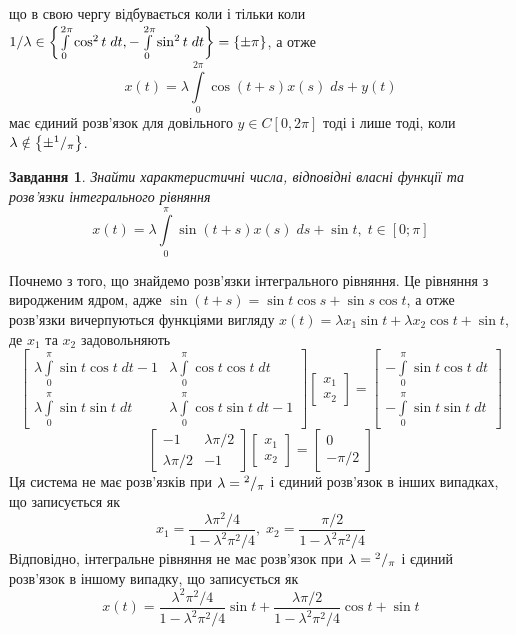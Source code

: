 \documentclass[10pt]{article}
\newtheorem{prob}{Завдання}
\newcommand{\ds}{\;ds}
\newcommand{\dt}{\;dt}
\let\oldint\int
\renewcommand{\int}{\oldint\limits}
\begin{document}
		що в свою чергу відбувається коли і тільки коли $1/\lambda\in\mycbra{
		\int_0^{2\pi}\cos^2t\dt,-\int_0^{2\pi}\sin^2t\dt}=\mycbra{\pm\pi}$, а отже
		\[x(t)=\lambda\int_0^{2\pi}\cos(t+s)x(s)\ds+y(t)\]
		має
		єдиний розв’язок для довільного $y\in C[0,2\pi]$ тоді і лише тоді, коли $\lambda\notin\left\{\pm{^{1}/_{\pi}}\right\}$.
\begin{prob}
	Знайти характеристичні числа, відповідні власні функції та розв’язки інтегрального рівняння
	\[x(t)=\lambda\int_{0}^{\pi}\sin(t+s) x(s)\ds+\sin t,\;t\in[0;\pi]\]
\end{prob}
	Почнемо з того, що знайдемо розв’язки інтегрального рівняння. Це рівняння з виродженим ядром, адже $\sin(t+s)=\sin t\cos s+
	\sin s\cos t$, а отже розв’язки вичерпуються функціями вигляду
	$x(t)=\lambda x_1\sin t+\lambda x_2\cos t+\sin t$, де $x_1$ та $x_2$ задовольняють
	\[\begin{bmatrix}
		\lambda\int_0^\pi \sin t\cos t\dt-1 & \lambda\int_0^\pi\cos t\cos t\dt\\
		\lambda\int_0^\pi \sin t\sin t\dt & \lambda\int_0^\pi\cos t\sin t\dt-1
	\end{bmatrix}
	\begin{bmatrix}x_1\\x_2\end{bmatrix}=\begin{bmatrix}-\int_0^\pi\sin t\cos t\dt\\
		-\int_0^\pi\sin t\sin t\dt\end{bmatrix}\]
	\[\begin{bmatrix}
		-1&\lambda\pi/2\\
		\lambda\pi/2&-1
	\end{bmatrix}
	\begin{bmatrix}x_1\\x_2\end{bmatrix}=\begin{bmatrix}0\\-\pi/2\end{bmatrix}\]
	Ця система не має розв’язків при $\lambda={^{2}/_{\pi}}$ і єдиний розв’язок в інших випадках, що записується як
	\[x_1=\frac{\lambda\pi^2/4}{1-\lambda^2\pi^2/4},\;x_2=\frac{\pi/2}{1-\lambda^2\pi^2/4}\]
	Відповідно, інтегральне рівняння не має розв’язок при $\lambda={^{2}/_{\pi}}$ і єдиний розв’язок в іншому випадку, що
	записується як
	\[x(t)=\frac{\lambda^2\pi^2/4}{1-\lambda^2\pi^2/4}\sin t+\frac{\lambda\pi/2}{1-\lambda^2\pi^2/4}\cos t+\sin t\]
\end{document}
